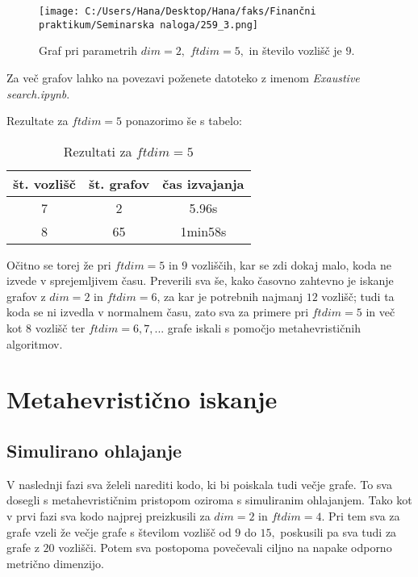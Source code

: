 \documentclass[12pt]{article}
\begin{document}
\begin{figure}[H]
    \centering
    \texttt{[image: C:/Users/Hana/Desktop/Hana/faks/Finančni praktikum/Seminarska naloga/259\_3.png]}
    \caption{Graf pri parametrih $dim = 2,$ $ftdim = 5,$ in število vozlišč je $9.$}
    \label{fig:slika259_3}
\end{figure}

Za več grafov lahko na povezavi poženete datoteko z imenom \textit{Exaustive search.ipynb}.

Rezultate za $ftdim = 5$ ponazorimo še s tabelo:

\begin{table}[H]
	\centering 
 	\begin{tabular}{|c|c|c|} 
 		\hline 
 		\textbf{št. vozlišč} & \textbf{št. grafov} & \textbf{čas izvajanja} \\
 		\hline 7 & 2 & 5.96s  \\ 
 		\hline 8 & 65 & 1min58s \\
 		\hline 
 	\end{tabular} 
 	\caption{Rezultati za $ftdim = 5$}
 	\label{tab:osebe}
\end{table}

Očitno se torej že pri $ftdim = 5$ in $9$ vozliščih, kar se zdi dokaj malo, koda ne izvede v sprejemljivem času. Preverili 
sva še, kako časovno zahtevno je iskanje grafov z $dim = 2$ in $ftdim = 6$, za kar je potrebnih najmanj $12$ vozlišč; tudi 
ta koda se ni izvedla v normalnem času, zato sva za primere pri $ftdim = 5$ in več kot $8$ vozlišč ter $ftdim = 6, 7, ...$ 
grafe iskali s pomočjo metahevrističnih algoritmov. 


\section{Metahevristično iskanje}

\subsection{Simulirano ohlajanje}

V naslednji fazi sva želeli narediti kodo, ki bi poiskala tudi večje grafe. To sva dosegli s metahevrističnim pristopom
oziroma s simuliranim ohlajanjem. Tako kot v prvi fazi sva kodo najprej preizkusili za $dim = 2$ in $ftdim = 4.$ Pri tem 
sva za grafe vzeli že večje grafe s številom vozlišč od $9$ do $15,$ poskusili pa sva tudi za grafe z $20$ vozlišči. 
Potem sva postopoma povečevali ciljno na napake odporno metrično dimenzijo.
 
\end{document}
